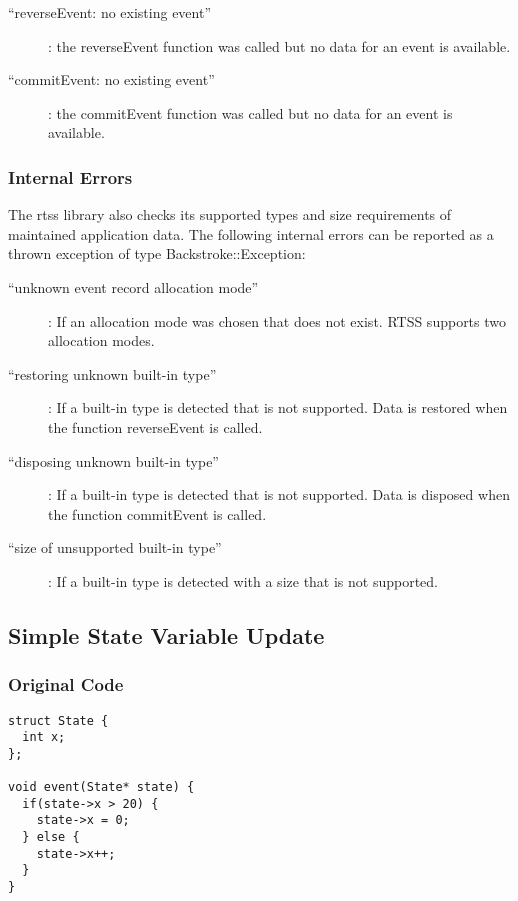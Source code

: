 \documentclass[english,12pt, titlepage]{article}      %
\begin{document}
\begin{description}
\item [``reverseEvent: no existing event'']: the reverseEvent function was
  called but no data for an event is available.
\item [``commitEvent: no existing event'']: the commitEvent function was
  called but no data for an event is available.
\end{description}

\subsubsection{Internal Errors}

The rtss library also checks its supported types and size requirements of maintained application data. The following internal errors can be reported as a thrown exception of type Backstroke::Exception:

\begin{description}
\item [``unknown event record allocation mode'']: If an allocation mode was chosen that does not exist. RTSS supports two allocation modes.
\item [``restoring unknown built-in type'']: If a built-in type is detected that is not supported. Data is restored when the function reverseEvent is called.
\item [``disposing unknown built-in type'']: If a built-in type is detected that is not supported. Data is disposed when the function commitEvent is called.
\item [``size of unsupported built-in type'']: If a built-in type is detected with a size that is not supported.
\end{description}

\subsection{Simple State Variable Update}
\label{exampleprogram1}

\subsubsection{Original Code}

{\footnotesize
\begin{verbatim}
struct State {
  int x;
};

void event(State* state) {           
  if(state->x > 20) {
    state->x = 0;
  } else {
    state->x++;
  }
}
\end{verbatim}
}
\end{document}
